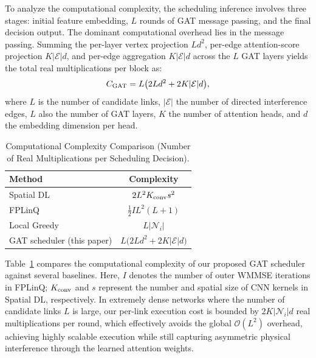 \documentclass[letterpaper,journal]{IEEEtran}
\begin{document}
	To analyze the computational complexity, the scheduling inference involves three stages: initial feature embedding, $L$ rounds of GAT message passing, and the final decision output. The dominant computational overhead lies in the message passing. Summing the per-layer vertex projection $L d^{2}$, per-edge attention-score projection $K |\mathcal{E}| d$, and per-edge aggregation $K |\mathcal{E}| d$ across the $L$ GAT layers yields the total real multiplications per block as:
	\begin{equation}
		C_{\rm GAT} = L\bigl(2 L d^{2} + 2 K |\mathcal{E}| d\bigr),
	\end{equation}
	where $L$ is the number of candidate links, $|\mathcal{E}|$ the number of directed interference edges, $L$ also the number of GAT layers, $K$ the number of attention heads, and $d$ the embedding dimension per head. 
	
	\begin{table}[!t]
		\centering
		\caption{Computational Complexity Comparison (Number of Real Multiplications per Scheduling Decision).}
		\label{tab:complexity}
		\begin{tabular}{lc}
			\toprule
			Method & Complexity \\
			\midrule
			Spatial DL~\cite{spatialDL}        & $2 L^{2} K_{\rm conv} s^{2}$ \\
			FPLinQ~\cite{fplinq}               & $\tfrac{1}{2} I L^{2}(L+1)$ \\
			Local Greedy~\cite{LGS}            & $L |\mathcal{N}_i|$ \\
			GAT scheduler (this paper)         & $L\bigl(2 L d^{2} + 2 K |\mathcal{E}| d\bigr)$ \\
			\bottomrule
		\end{tabular}
	\end{table}
	
	Table~\ref{tab:complexity} compares the computational complexity of our proposed GAT scheduler against several baselines. Here, $I$ denotes the number of outer WMMSE iterations in FPLinQ; $K_{\rm conv}$ and $s$ represent the number and spatial size of CNN kernels in Spatial DL, respectively. In extremely dense networks where the number of candidate links $L$ is large, our per-link execution cost is bounded by $2 K |\mathcal{N}_i| d$ real multiplications per round, which effectively avoids the global $\mathcal{O}(L^2)$ overhead, achieving highly scalable execution while still capturing asymmetric physical interference through the learned attention weights.
	
	
	
\end{document}
